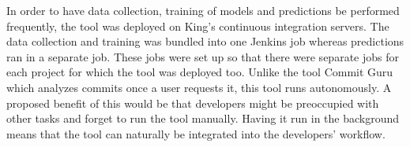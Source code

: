 \documentclass[../main.tex]{subfiles}
\begin{document}
In order to have data collection, training of models and predictions be performed frequently, the tool was deployed on King's continuous integration servers. The data collection and training was bundled into one Jenkins job whereas predictions ran in a separate job. These jobs were set up so that there were separate jobs for each project for which the tool was deployed too. Unlike the tool Commit Guru which analyzes commits once a user requests it, this tool runs autonomously. A proposed benefit of this would be that developers might be preoccupied with other tasks and forget to run the tool manually. Having it run in the background means that the tool can naturally be integrated into the developers' workflow. 
\end{document}
